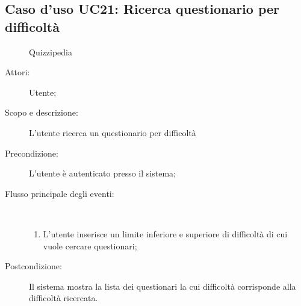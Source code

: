 \subsection{Caso d'uso UC21: Ricerca questionario per difficoltà}
	\begin{figure}[H]
		\centering
		\begin{resizedtikzpicture}{\textwidth}
		\begin{umlsystem}[x=0, fill=lightgray!20]{Quizzipedia}
		\end{umlsystem}
		\end{resizedtikzpicture}
		\caption{}
	\end{figure}
\begin{description}
\item[Attori:] Utente;
\item[Scopo e descrizione:] L'utente ricerca un questionario per difficoltà
      \item[Precondizione:] L'utente è autenticato presso il sistema;

        \item[Flusso principale degli eventi:] \ 
 \begin{enumerate}
          \item L'utente inserisce un limite inferiore e superiore di difficoltà di cui vuole cercare questionari;

      \end{enumerate}
    \item[Postcondizione:] Il sistema mostra la lista dei questionari la cui difficoltà corrisponde alla difficoltà ricercata.
  \end{description}
\hypertarget{UC22}{}
